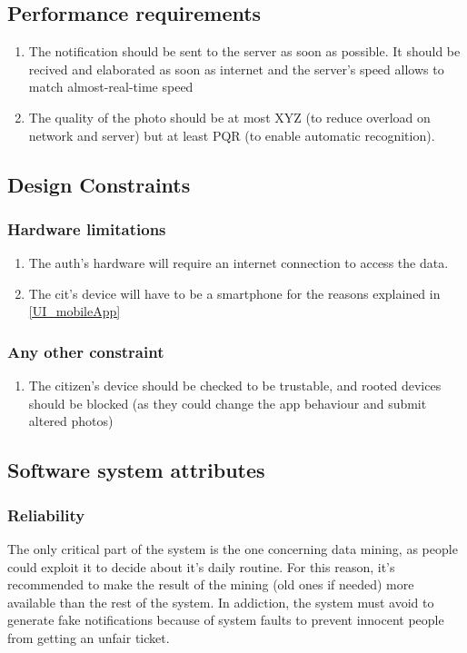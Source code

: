 \documentclass{article}
\newcommand{\enum}[1]{\texttt{#1.\arabic*}}
\begin{document}
	\subsection{Performance requirements}
		\begin{enumerate}[label=\enum{P}]
			\item The notification should be sent to the server as soon as possible. It should be recived and elaborated as soon as internet and the server's speed allows to match almost-real-time speed
			\item The quality of the photo should be at most XYZ (to reduce overload on network and server) but at least PQR (to enable automatic recognition).
		\end{enumerate}
		
	\subsection{Design Constraints}
	
		\subsubsection{Hardware limitations} 
			\begin{enumerate}[label=\enum{SW}]
				\item The auth's hardware will require an internet connection to access the data.
				\item The cit's device will have to be a smartphone for the reasons explained in \ref{UI_mobileApp}
			\end{enumerate}					
		
		\subsubsection{Any other constraint} 
			\begin{enumerate}[label=\enum{OT}]
				\item The citizen's device should be checked to be trustable, and rooted devices should be blocked (as they could change the app behaviour and submit altered photos)
			\end{enumerate}		
		
	\subsection{Software system attributes}
	
		\subsubsection{Reliability}
			The only critical part of the system is the one concerning data mining, as people could exploit it to decide about it's daily routine. For this reason, it's recommended to make the result of the mining (old ones if needed) more available than the rest of the system.
			In addiction, the system must avoid to generate fake notifications because of system faults to prevent innocent people from getting an unfair ticket.
			
\end{document}
